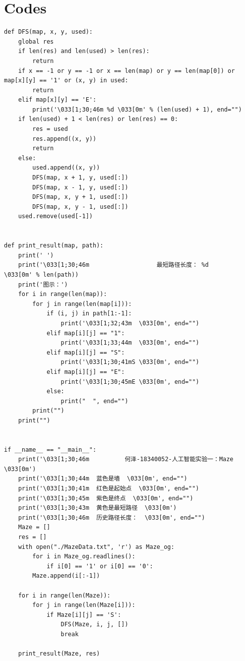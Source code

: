 \documentclass[a4paper, 11pt]{article}
\begin{document}
\section{Codes}
\begin{lstlisting}
def DFS(map, x, y, used):
	global res
	if len(res) and len(used) > len(res):
		return
	if x == -1 or y == -1 or x == len(map) or y == len(map[0]) or map[x][y] == '1' or (x, y) in used:
		return
	elif map[x][y] == 'E':
		print('\033[1;30;46m %d \033[0m' % (len(used) + 1), end="")
	if len(used) + 1 < len(res) or len(res) == 0:
		res = used
		res.append((x, y))
		return
	else:
		used.append((x, y))
		DFS(map, x + 1, y, used[:])
		DFS(map, x - 1, y, used[:])
		DFS(map, x, y + 1, used[:])
		DFS(map, x, y - 1, used[:])
	used.remove(used[-1])


def print_result(map, path):
	print(' ')
	print('\033[1;30;46m                   最短路径长度： %d                   \033[0m' % len(path))
	print('图示：')
	for i in range(len(map)):
		for j in range(len(map[i])):
			if (i, j) in path[1:-1]:
				print('\033[1;32;43m  \033[0m', end="")
			elif map[i][j] == "1":
				print('\033[1;33;44m  \033[0m', end="")
			elif map[i][j] == "S":
				print('\033[1;30;41mS \033[0m', end="")
			elif map[i][j] == "E":
				print('\033[1;30;45mE \033[0m', end="")
			else:
				print("  ", end="")
		print("")
	print("")


if __name__ == "__main__":
	print('\033[1;30;46m          何泽-18340052-人工智能实验一：Maze            \033[0m')
	print('\033[1;30;44m  蓝色是墙  \033[0m', end="")
	print('\033[1;30;41m  红色是起始点  \033[0m', end="")
	print('\033[1;30;45m  紫色是终点  \033[0m', end="")
	print('\033[1;30;43m  黄色是最短路径  \033[0m')
	print('\033[1;30;46m  历史路径长度：  \033[0m', end="")
	Maze = []
	res = []
	with open("./MazeData.txt", 'r') as Maze_og:
		for i in Maze_og.readlines():
			if i[0] == '1' or i[0] == '0':
		Maze.append(i[:-1])

	for i in range(len(Maze)):
		for j in range(len(Maze[i])):
			if Maze[i][j] == 'S':
				DFS(Maze, i, j, [])
				break

	print_result(Maze, res)
\end{lstlisting}
\end{document}
